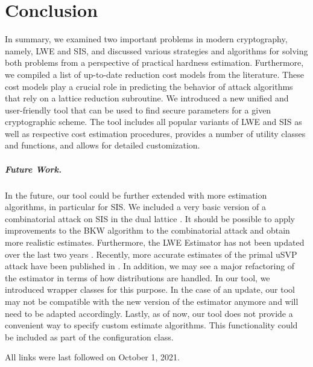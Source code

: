\documentclass[
  a4paper,  %
  twoside,  %
  bibliography=totoc,
  headsepline,
  cleardoublepage=empty,
  parskip=half,
  draft=false
]{scrbook}
\begin{document}
\chapter{Conclusion}
In summary, we examined two important problems in modern cryptography, namely, LWE and SIS, and discussed various strategies and algorithms for solving both problems from a perspective of practical hardness estimation. Furthermore, we compiled a list of up-to-date reduction cost models from the literature. These cost models play a crucial role in predicting the behavior of attack algorithms that rely on a lattice reduction subroutine. We introduced a new unified and user-friendly tool that can be used to find secure parameters for a given cryptographic scheme. The tool includes all popular variants of LWE and SIS as well as respective cost estimation procedures, provides a number of utility classes and functions, and allows for detailed customization.

\paragraph{Future Work.} In the future, our tool could be further extended with more estimation algorithms, in particular for SIS. We included a very basic version of a combinatorial attack on SIS in the dual lattice \cite{MR09}. It should be possible to apply improvements to the BKW algorithm to the combinatorial attack and obtain more realistic estimates. Furthermore, the LWE Estimator has not been updated over the last two years \cite{APS15}. Recently, more accurate estimates of the primal uSVP attack have been published in \cite{PV21}. In addition, we may see a major refactoring of the estimator in terms of how distributions are handled. In our tool, we introduced wrapper classes for this purpose. In the case of an update, our tool may not be compatible with the new version of the estimator anymore and will need to be adapted accordingly.
Lastly, as of now, our tool does not provide a convenient way to specify custom estimate algorithms. This functionality could be included as part of the configuration class.


\printbibliography

All links were last followed on October 1, 2021.

\appendix
{}


\pagestyle{empty}
\renewcommand*{\chapterpagestyle}{empty}
\Versicherung
\end{document}
